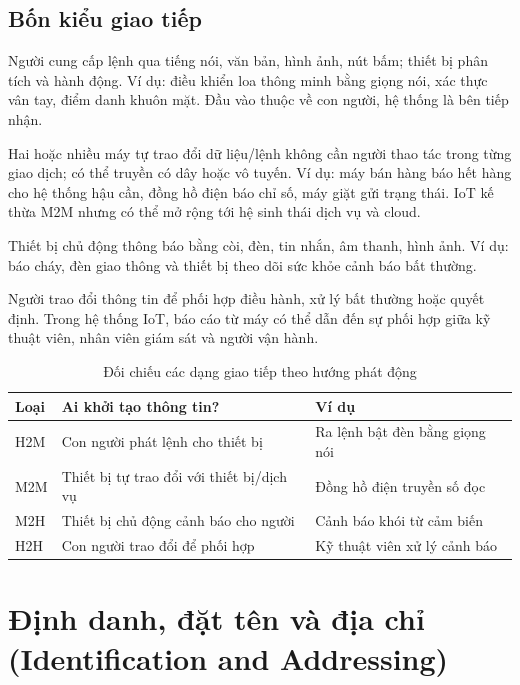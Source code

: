 \subsection{Bốn kiểu giao tiếp}
\begin{description}[style=nextline,leftmargin=6mm]
\item[Human-to-Machine (H2M) — Người đến máy.] Người cung cấp lệnh qua tiếng nói, văn bản, hình ảnh, nút bấm; thiết bị phân tích và hành động. Ví dụ: điều khiển loa thông minh bằng giọng nói, xác thực vân tay, điểm danh khuôn mặt. Đầu vào thuộc về con người, hệ thống là bên tiếp nhận.
\item[Machine-to-Machine (M2M) — Máy đến máy.] Hai hoặc nhiều máy tự trao đổi dữ liệu/lệnh không cần người thao tác trong từng giao dịch; có thể truyền có dây hoặc vô tuyến. Ví dụ: máy bán hàng báo hết hàng cho hệ thống hậu cần, đồng hồ điện báo chỉ số, máy giặt gửi trạng thái. IoT kế thừa M2M nhưng có thể mở rộng tới hệ sinh thái dịch vụ và cloud.
\item[Machine-to-Human (M2H) — Máy đến người.] Thiết bị chủ động thông báo bằng còi, đèn, tin nhắn, âm thanh, hình ảnh. Ví dụ: báo cháy, đèn giao thông và thiết bị theo dõi sức khỏe cảnh báo bất thường.
\item[Human-to-Human (H2H) — Người đến người.] Người trao đổi thông tin để phối hợp điều hành, xử lý bất thường hoặc quyết định. Trong hệ thống IoT, báo cáo từ máy có thể dẫn đến sự phối hợp giữa kỹ thuật viên, nhân viên giám sát và người vận hành.
\end{description}
\begin{table}[htbp]\centering\small
\caption{Đối chiếu các dạng giao tiếp theo hướng phát động}
\begin{tabularx}{\textwidth}{@{}p{15mm}X X@{}}\toprule
\textbf{Loại} & \textbf{Ai khởi tạo thông tin?} & \textbf{Ví dụ}\tabularnewline\midrule
H2M & Con người phát lệnh cho thiết bị & Ra lệnh bật đèn bằng giọng nói\\
M2M & Thiết bị tự trao đổi với thiết bị/dịch vụ & Đồng hồ điện truyền số đọc\\
M2H & Thiết bị chủ động cảnh báo cho người & Cảnh báo khói từ cảm biến\\
H2H & Con người trao đổi để phối hợp & Kỹ thuật viên xử lý cảnh báo\\\bottomrule
\end{tabularx}
\end{table}
\section{Định danh, đặt tên và địa chỉ (Identification and Addressing)}
